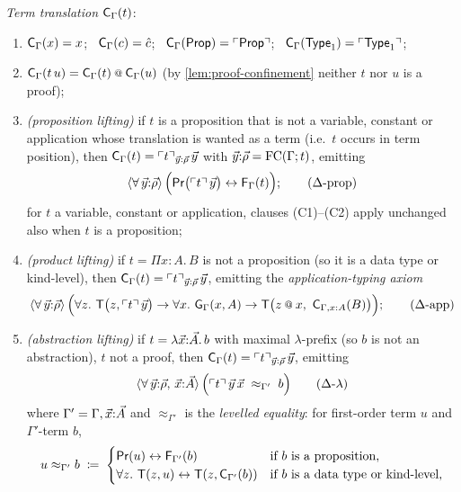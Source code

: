 \begin{definition}[Translation]
\noindent\emph{Term translation} $\mathsf{C}_{\Gamma}(t)$:
\begin{enumerate}[label=(C\arabic*),leftmargin=3em]
\item $\mathsf{C}_{\Gamma}(x) = x$; \ $\mathsf{C}_{\Gamma}(c) = \hat{c}$; \
  $\mathsf{C}_{\Gamma}(\mathsf{Prop}) = \ulcorner \mathsf{Prop} \urcorner$; \
  $\mathsf{C}_{\Gamma}(\mathsf{Type}_1) = \ulcorner \mathsf{Type}_1 \urcorner$;
\item $\trC{\Gamma}{t\,u} = \trC{\Gamma}{t} \app \trC{\Gamma}{u}$
  (by \cref{lem:proof-confinement} neither $t$ nor $u$ is a proof);
\item \emph{(proposition lifting)} if $t$ is a proposition that is
  not a variable, constant or application whose translation is
  wanted as a term (i.e.\ $t$ occurs in term position), then
  $\mathsf{C}_{\Gamma}(t) = \ulcorner t \urcorner_{\vec{y}:\vec{\rho}}\,\vec{y}$ with
  $\vec{y}{:}\vec{\rho} = \mathrm{FC}(\Gamma; t)$, emitting
  \[
    \langle \forall\, \tup{y}{:}\tup{\rho} \rangle\,
    \Bigl( \PR\bigl(\lift{t}\,\tup{y}\bigr) \leftrightarrow
           \trF{\Gamma}{t} \Bigr) ;
    \tag{$\Ax$-prop}
  \]
  for $t$ a variable, constant or application, clauses (C1)--(C2)
  apply unchanged also when $t$ is a proposition;
\item \emph{(product lifting)} if $t = \Pi x{:}A.\,B$ is not a
  proposition (so it is a data type or kind-level), then
  $\mathsf{C}_{\Gamma}(t) = \ulcorner t \urcorner_{\vec{y}:\vec{\rho}}\,\vec{y}$,
  emitting the \emph{application-typing axiom}
  \[
    \langle \forall\, \tup{y}{:}\tup{\rho} \rangle\,
    \Bigl( \forall z.\ \hastype\bigl(z, \lift{t}\,\tup{y}\bigr) \to
      \forall x.\ \trG{\Gamma}{x}{A} \to
      \hastype\bigl(z \app x,\ \trC{\Gamma,x:A}{B}\bigr) \Bigr) ;
    \tag{$\Ax$-app}
  \]
\item \emph{(abstraction lifting)} if $t = \lambda
  \vec{x}{:}\vec{A}.\,b$ with maximal $\lambda$-prefix (so $b$ is
  not an abstraction), $t$ not a proof, then $\mathsf{C}_{\Gamma}(t) =
  \ulcorner t \urcorner_{\vec{y}:\vec{\rho}}\,\vec{y}$, emitting
  \[
    \langle \forall\, \tup{y}{:}\tup{\rho},\, \tup{x}{:}\tup{A}
    \rangle\, \Bigl( \lift{t}\,\tup{y}\,\tup{x} \;\approx_{\Gamma'}\;
    b \Bigr)
    \tag{$\Ax$-$\lambda$}
  \]
  where $\Gamma' = \Gamma, \vec{x}{:}\vec{A}$ and
  $\approx_{\Gamma'}$ is the \emph{levelled equality}: for
  first-order term $u$ and $\Gamma'$-term $b$,
  \[
    u \approx_{\Gamma'} b \;\coloneqq\;
    \begin{cases}
      \mathsf{Pr}(u) \leftrightarrow \mathsf{F}_{\Gamma'}(b) & \text{if $b$ is a proposition,}\\
      \forall z.\ \mathsf{T}(z, u) \leftrightarrow
        \mathsf{T}(z, \mathsf{C}_{\Gamma'}(b)) & \text{if $b$ is a data type or kind-level,}\\

\end{cases}\]
\end{enumerate}
\end{definition}
